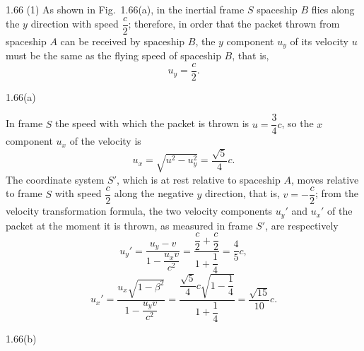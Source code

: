 \begin{solution}{1.66}
(1) As shown in Fig.~1.66(a), in the inertial frame $S$ spaceship $B$ flies along the $y$ direction with speed $\dfrac{c}{2}$; therefore, in order that the packet thrown from spaceship $A$ can be received by spaceship $B$, the $y$ component $u_y$ of its velocity $u$ must be the same as the flying speed of spaceship $B$, that is,
\[
u_y=\frac{c}{2}.
\]

\begin{figbox}{1.66(a)}
\end{figbox}

In frame $S$ the speed with which the packet is thrown is $u=\dfrac{3}{4}c$, so the $x$ component $u_x$ of the velocity is
\[
u_x=\sqrt{u^2-u_y^2}=\frac{\sqrt{5}}{4}c .
\]
The coordinate system $S'$, which is at rest relative to spaceship $A$, moves relative to frame $S$ with speed $\dfrac{c}{2}$ along the negative $y$ direction, that is, $v=-\dfrac{c}{2}$; from the velocity transformation formula, the two velocity components $u_y'$ and $u_x'$ of the packet at the moment it is thrown, as measured in frame $S'$, are respectively
\[
u_y'=\frac{u_y-v}{1-\dfrac{u_xv}{c^2}}=\frac{\dfrac{c}{2}+\dfrac{c}{2}}{1+\dfrac{1}{4}}=\frac{4}{5}c,
\]
\[
u_x'=\frac{u_x\sqrt{1-\beta^2}}{1-\dfrac{u_yv}{c^2}}
=\frac{\dfrac{\sqrt{5}}{4}c\sqrt{1-\dfrac{1}{4}}}{1+\dfrac{1}{4}}=\frac{\sqrt{15}}{10}c .
\]

\begin{figbox}{1.66(b)}
\end{figbox}


\end{solution}
